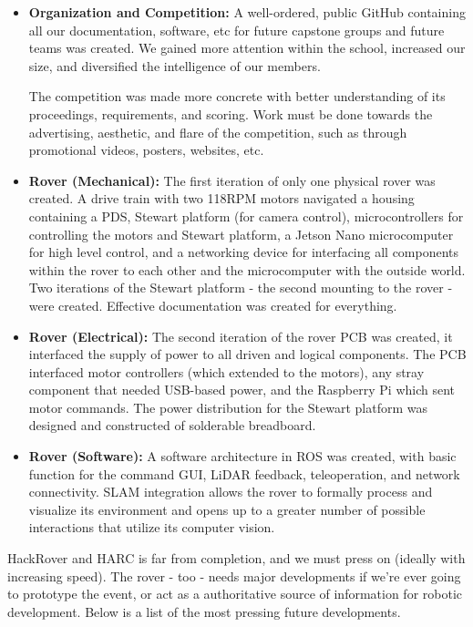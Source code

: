 \documentclass[a4paper, 10pt]{article}
\begin{document}
	\begin{itemize}
		\item \textbf{Organization and Competition:} A well-ordered, public GitHub containing all our documentation, software, etc for future capstone groups and future teams was created. We gained more attention within the school, increased our size, and diversified the intelligence of our members.
		
		The competition was made more concrete with better understanding of its proceedings, requirements, and scoring. Work must be done towards the advertising, aesthetic, and flare of the competition, such as through promotional videos, posters, websites, etc.
		
		\item \textbf{Rover (Mechanical):} The first iteration of only one physical rover was created. A drive train with two 118RPM motors navigated a housing containing a PDS, Stewart platform (for camera control), microcontrollers for controlling the motors and Stewart platform, a Jetson Nano microcomputer for high level control, and a networking device for interfacing all components within the rover to each other and the microcomputer  with the outside world. Two iterations of the Stewart platform - the second mounting to the rover - were created. Effective documentation was created for everything.
		
		\item \textbf{Rover (Electrical):} The second iteration of the rover PCB was created, it interfaced the supply of power to all driven and logical components. The PCB interfaced motor controllers (which extended to the motors), any stray component that needed USB-based power, and the Raspberry Pi which sent motor commands. The power distribution for the Stewart platform was designed and constructed of solderable breadboard.
		
		\item \textbf{Rover (Software):} A software architecture in ROS was created, with basic function for the command GUI, LiDAR feedback, teleoperation, and network connectivity. SLAM integration allows the rover to formally process and visualize its environment and opens up to a greater number of possible interactions that utilize its computer vision.
	\end{itemize}
		
HackRover and HARC is far from completion, and we must press on (ideally with increasing speed). The rover - too - needs major developments if we're ever going to prototype the event, or act as a authoritative source of information for robotic development. Below is a list of the most pressing future developments.
\end{document}
